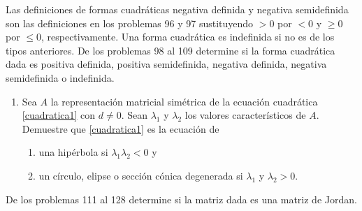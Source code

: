 Las definiciones de formas cuadráticas negativa definida y negativa semidefinida son las definiciones en los problemas 96 y 97 sustituyendo $>0$ por $<0$ y $\geq 0$ por $\leq 0$, respectivamente. Una forma cuadrática es indefinida si no es de los tipos anteriores. De los problemas 98 al 109 determine si la forma cuadrática dada es positiva definida, positiva semidefinida, negativa definida, negativa semidefinida o indefinida.
\begin{multienumerate}
    \setcounter{multienumi}{97}
\end{multienumerate}
\begin{enumerate}[start=110]
    \item Sea $A$ la representación matricial simétrica de la ecuación cuadrática \eqref{cuadratica1} con $d \neq 0$. Sean $\lambda_{1}$ y $\lambda_{2}$ los valores característicos de $A$. Demuestre que \eqref{cuadratica1} es la ecuación de
    \begin{enumerate}
        \item una hipérbola si $\lambda_{1} \lambda_{2}<0$ y
        \item un círculo, elipse o sección cónica degenerada si $\lambda_{1}$ y $\lambda_{2}>0$.
    \end{enumerate}
\end{enumerate}
De los problemas 111 al 128 determine si la matriz dada es una matriz de Jordan.
